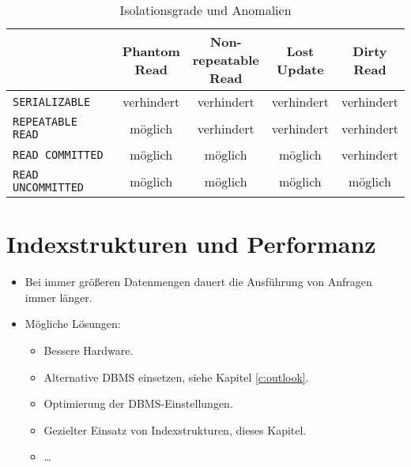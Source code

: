 \documentclass[a4paper, 11pt, accentcolor = tud3b]{tudreport}
\begin{document}
                \begin{table}[H]
                    \centering
                    \begin{tabular}{l | c | c | c | c}
                    	                             & \makecell{Phantom \\ Read} & \makecell{Non- \\ repeatable \\ Read} & \makecell{Lost \\ Update} & \makecell{Dirty \\ Read} \\ \hline
                    	\lstinline|SERIALIZABLE|     & verhindert                 & verhindert                            & verhindert                & verhindert               \\
                    	\lstinline|REPEATABLE READ|  & möglich                    & verhindert                            & verhindert                & verhindert               \\
                    	\lstinline|READ COMMITTED|   & möglich                    & möglich                               & möglich                   & verhindert               \\
                    	\lstinline|READ UNCOMMITTED| & möglich                    & möglich                               & möglich                   & möglich
                    \end{tabular}
                    \caption{Isolationsgrade und Anomalien}
                \end{table}

    \chapter{Indexstrukturen und Performanz} %
	    \label{c:performance}
	    
	    \begin{itemize}
	    	\item Bei immer größeren Datenmengen dauert die Ausführung von Anfragen immer länger.
	    	\item Mögliche Lösungen:
	    		\begin{itemize}
	    			\item Bessere Hardware.
	    			\item Alternative DBMS einsetzen, siehe Kapitel \ref{c:outlook}.
	    			\item Optimierung der DBMS-Einstellungen.
	    			\item Gezielter Einsatz von Indexstrukturen, dieses Kapitel.
	    			\item \dots
	    		\end{itemize}
	    \end{itemize}
\end{document}
